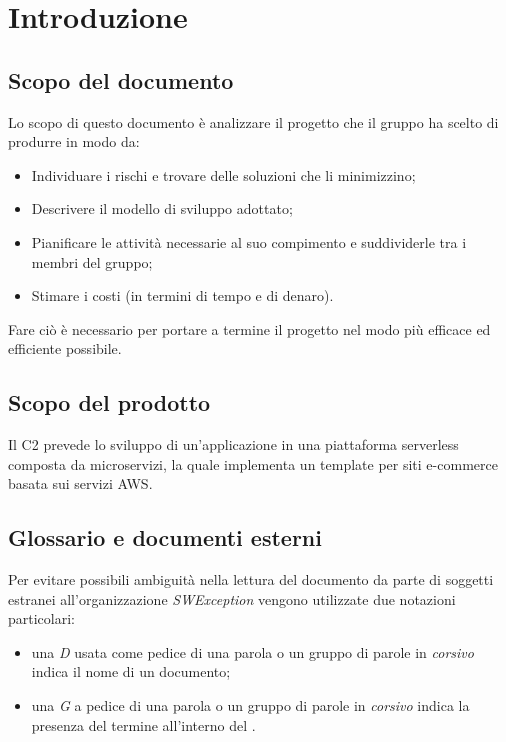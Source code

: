 \section{Introduzione} \label{_introduzione}

\subsection{Scopo del documento}
Lo scopo di questo documento è analizzare il progetto che il gruppo ha scelto di produrre in modo da:
\begin{itemize}
    \item Individuare i rischi e trovare delle soluzioni che li minimizzino;
    \item Descrivere il modello di sviluppo adottato;
    \item Pianificare le attività necessarie al suo compimento e suddividerle tra i membri del gruppo;
    \item Stimare i costi (in termini di tempo e di denaro).
\end{itemize}
Fare ciò è necessario per portare a termine il progetto nel modo più efficace ed efficiente possibile.

\subsection{Scopo del prodotto}
Il  C2 prevede lo sviluppo di un'applicazione in una piattaforma serverless composta da microservizi, la quale implementa un template per siti e-commerce basata sui servizi AWS.

\subsection{Glossario  e documenti esterni}
Per evitare possibili ambiguità nella lettura del documento da parte di soggetti estranei all'organizzazione \textit{SWException} vengono utilizzate due notazioni particolari:
\begin{itemize}
    \item una \textit{D} usata come pedice di una parola o un gruppo di parole in \textit{corsivo} indica il nome di un documento;
    \item una \textit{G} a pedice di una parola o un gruppo di parole in \textit{corsivo} indica la presenza del termine all'interno del .
\end{itemize}

